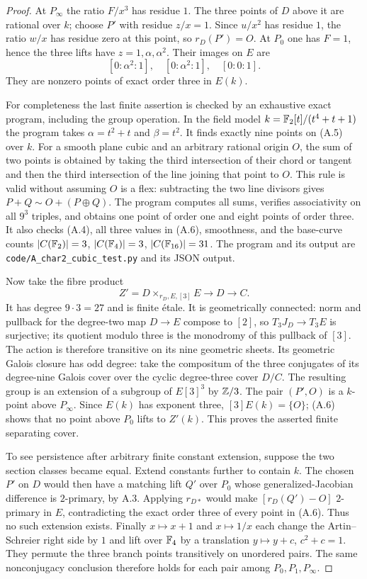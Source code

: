 \begin{proof}
At $P_\infty$ the ratio $F/x^3$ has residue $1$. The three
points of $D$ above it are rational over $k$; choose $P'$ with
residue $z/x=1$. Since $u/x^2$ has residue $1$, the ratio
$w/x$ has residue zero at this point, so $r_D(P')=O$.
At $P_0$ one has $F=1$, hence the three lifts have
$z=1,\alpha,\alpha^2$. Their images on $E$ are
\[
 [0:\alpha^2:1],\quad[0:\alpha^2:1],\quad[0:0:1].              \tag{A.6}
\]
They are nonzero points of exact order three in $E(k)$.

For completeness the last finite assertion is checked by an
exhaustive exact program, including the group operation. In the
field model $k=\mathbb F_2[t]/(t^4+t+1)$ the program takes
$\alpha=t^2+t$ and $\beta=t^2$. It finds exactly nine points on
(A.5) over $k$. For a smooth plane cubic and an arbitrary rational
origin $O$, the sum of two points is obtained by taking the third
intersection of their chord or tangent and then the third
intersection of the line joining that point to $O$.
This rule is valid without assuming $O$ is a flex: subtracting the
two line divisors gives $P+Q\sim O+(P\oplus Q)$.
The program computes all sums, verifies associativity on all
$9^3$ triples, and obtains one point of order one and eight
points of order three. It also checks (A.4), all three values
in (A.6), smoothness, and the base-curve counts
$|C(\mathbb F_2)|=3$, $|C(\mathbb F_4)|=3$, $|C(\mathbb F_{16})|=31$.
The program and its output are
\texttt{code/A\_char2\_cubic\_test.py} and its JSON output.

Now take the fibre product
\[
 Z'=D\times_{r_D,E,[3]}E\longrightarrow D\longrightarrow C.
\]
It has degree $9\cdot3=27$ and is finite \'etale.
It is geometrically connected: norm and pullback for the
degree-two map $D\to E$ compose to $[2]$, so
$T_3J_D\to T_3E$ is surjective; its quotient modulo three is
the monodromy of this pullback of $[3]$. The action is therefore
transitive on its nine geometric sheets.
Its geometric Galois closure has odd degree: take the compositum
of the three conjugates of its degree-nine Galois cover over
the cyclic degree-three cover $D/C$. The resulting group is an
extension of a subgroup of $E[3]^3$ by $\mathbb Z/3$.
The pair $(P',O)$ is a $k$-point above $P_\infty$.
Since $E(k)$ has exponent three, $[3]E(k)=\{O\}$; (A.6)
shows that no point above $P_0$ lifts to $Z'(k)$. This proves
the asserted finite separating cover.

To see persistence after arbitrary finite constant extension,
suppose the two section classes became equal. Extend constants
further to contain $k$. The chosen $P'$ on $D$ would then have
a matching lift $Q'$ over $P_0$ whose generalized-Jacobian
difference is $2$-primary, by A.3. Applying $r_{D*}$ would make
$[r_D(Q')-O]$ $2$-primary in $E$, contradicting the exact order
three of every point in (A.6). Thus no such extension exists.
Finally $x\mapsto x+1$ and $x\mapsto1/x$ each change the
Artin--Schreier right side by $1$ and lift over $\mathbb F_4$ by a
translation $y\mapsto y+c$, $c^2+c=1$. They permute the three
branch points transitively on unordered pairs. The same
nonconjugacy conclusion therefore holds for each pair among
$P_0,P_1,P_\infty$.
\end{proof}

